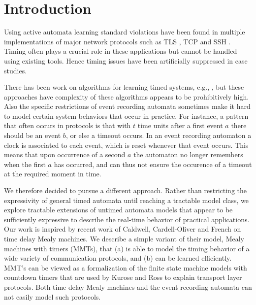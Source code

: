 \section{Introduction}
\label{sec:intro}


Using active automata learning standard violations have been found in multiple implementations of
major network protocols such as TLS \cite{dRP15}, TCP \cite{FJV16} and SSH \cite{FiterauEtAl17}.
Timing often plays a crucial role in these applications but cannot be handled using existing tools.
Hence timing issues have been artificially suppressed in case studies.

There has been work on algorithms for learning timed systems, e.g., \cite{GrinchteinJL10,MensM15,CCF16},
but these approaches have complexity of these algorithms appears to be prohibitively high.
Also the specific restrictions of event recording automata sometimes make it hard to model
certain system behaviors that occur in practice.
For instance, a pattern that often occurs in protocols is that with $t$ time units after a first event $a$
there should be an event $b$, or else a timeout occurs.
In an event recording automaton a clock is associated to each event, which is reset whenever that event occurs.
This means that upon occurrence of a second $a$ the automaton no longer remembers when the first $a$ has occurred,
and can thus not ensure the occurence of a timeout at the required moment in time.

We therefore decided to pursue a different approach. Rather than restricting the expressivity of general timed automata
until reaching a tractable model class, we explore tractable extensions of untimed automata models that appear to
be sufficiently expressive to describe the real-time behavior of practical applications.
%
Our work is inspired by recent work of Caldwell, Cardell-Oliver and French \cite{CCF16} on time delay Mealy machines.
We describe a simple variant of their model, Mealy machines with timers (MMTs), that 
(a) is able to model the timing behavior of a wide variety of communication protocols, and
(b) can be learned efficiently.
MMT's can be viewed as a formalization of the finite state machine models with countdown timers that are used by
Kurose and Ross \cite{KR13} to explain transport layer protocols.
Both time delay Mealy machines \cite{CCF16} and the event recording automata \cite{GrinchteinJL10} can not easily model such protocols.


